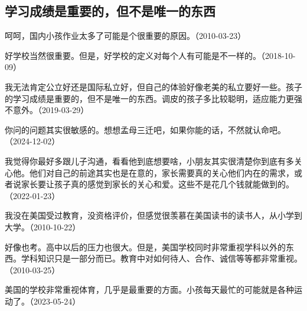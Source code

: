 \subsection{学习成绩是重要的，但不是唯一的东西}


呵呵，国内小孩作业太多了可能是个很重要的原因。（2010-03-23）


好学校当然很重要。但是，好学校的定义对每个人有可能是不一样的。（2018-10-09）


我无法肯定公立好还是国际私立好，但自己的体验好像老美的私立要好一些。孩子的学习成绩是重要的，但不是唯一的东西。调皮的孩子多比较聪明，适应能力更强不意外。（2019-03-29）


你问的问题其实很敏感的。想想孟母三迁吧，如果你能的话，不然就认命吧。（2024-12-02）


我觉得你最好多跟儿子沟通，看看他到底想要啥，小朋友其实很清楚你到底有多关心他。他们对自己的前途其实也是在意的，家长需要真的关心他们内在的需求，或者说家长要让孩子真的感觉到家长的关心和爱。这些不是花几个钱就能做到的。（2022-01-23）


我没在美国受过教育，没资格评价，但感觉很羡慕在美国读书的读书人，从小学到大学。（2010-10-22）


好像也考。高中以后的压力也很大。但是，美国学校同时非常重视学科以外的东西。学科知识只是一部分而已。教育中对如何待人、合作、诚信等等都非常重视。（2010-03-25）

美国的学校非常重视体育，几乎是最重要的方面。小孩每天最忙的可能就是各种运动了。（2023-05-24）


